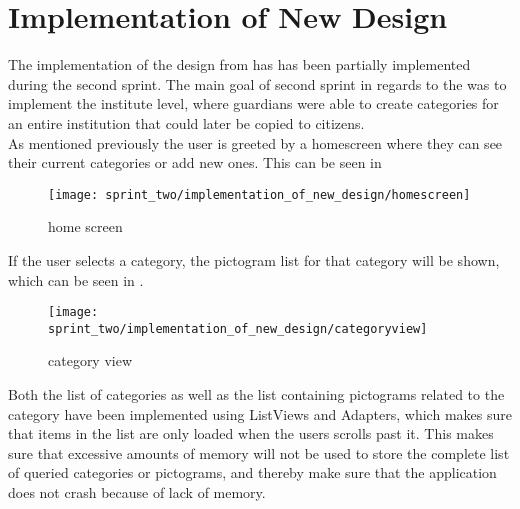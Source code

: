 \section{Implementation of New Design}
\label{sec:implementation_of_new_design}

The implementation of the design from  has has been partially implemented during the second sprint. The main goal of second sprint in regards to the \ct was to implement the institute level, where guardians were able to create categories for an entire institution that could later be copied to citizens.\\

As mentioned previously the user is greeted by a homescreen where they can see their current categories or add new ones. This can be seen in 

\begin{figure}[!htbp]
    \centering
    \texttt{[image: sprint\_two/implementation\_of\_new\_design/homescreen]}
    \caption{\ct home screen}
    \label{fig:ct_home_screen}
\end{figure}

If the user selects a category, the pictogram list for that category will be shown, which can be seen in .\\

\begin{figure}[!htbp]
    \centering
    \texttt{[image: sprint\_two/implementation\_of\_new\_design/categoryview]}
    \caption{\ct category view}
    \label{fig:ct_category_view}
\end{figure}


Both the list of categories as well as the list containing pictograms related to the category have been implemented using ListViews and Adapters, which makes sure that items in the list are only loaded when the users scrolls past it. This makes sure that excessive amounts of memory will not be used to store the complete list of queried categories or pictograms, and thereby make sure that the application does not crash because of lack of memory. 